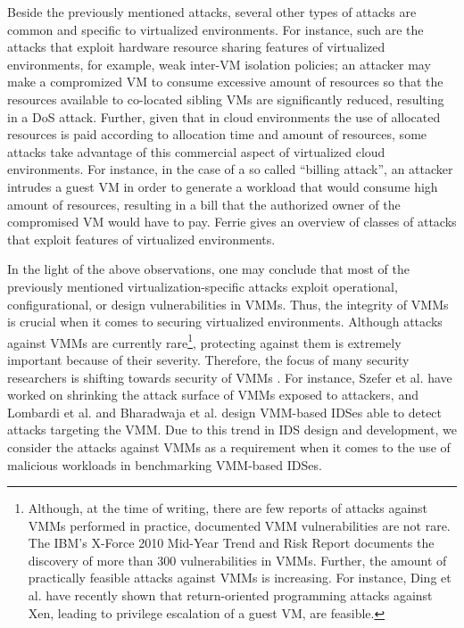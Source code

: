 Beside the previously mentioned attacks, several other types of attacks are common and specific to virtualized environments. For instance, such are the attacks that exploit hardware resource sharing features of virtualized environments, for example, weak inter-VM isolation policies; an attacker may make a compromized VM to consume excessive amount of resources so that the resources available to co-located sibling VMs are significantly reduced, resulting in a DoS attack. Further, given that in cloud environments the use of allocated resources is paid according to allocation time and amount of resources, some attacks take advantage of this commercial aspect of virtualized cloud environments. For instance, in the case of a so called ``billing attack'', an attacker intrudes a guest VM in order to generate a workload that would consume high amount of resources, resulting in a bill that the authorized owner of the compromised VM would have to pay. Ferrie \cite{ferrie:attacks} gives an overview of classes of attacks that exploit features of virtualized environments. 

In the light of the above observations, one may conclude that most of the previously mentioned virtualization-specific attacks exploit operational, configurational, or design vulnerabilities in VMMs. Thus, the integrity of VMMs is crucial when it comes to securing virtualized environments. Although attacks against VMMs are currently rare\footnote{Although, at the time of writing, there are few reports of attacks against VMMs performed in practice, documented VMM vulnerabilities are not rare. The IBM's X-Force 2010 Mid-Year Trend and Risk Report \cite{ibm:midterm} documents the discovery of more than 300 vulnerabilities in VMMs. Further, the amount of practically feasible attacks against VMMs is increasing. For instance, Ding et al. \cite{ding:return_oriented} have recently shown that return-oriented programming attacks against Xen, leading to privilege escalation of a guest VM, are feasible.}, protecting against them is extremely important because of their severity. Therefore, the focus of many security researchers is shifting towards security of VMMs \cite{informationweek:vulnerability}. For instance, Szefer et al. \cite{szefer:eliminating} have worked on shrinking the attack surface of VMMs exposed to attackers, and Lombardi et al. \cite{lombardi:secure} and Bharadwaja et al. \cite{bharadwaja:axen} design VMM-based IDSes able to detect attacks targeting the VMM. Due to this trend in IDS design and development, we consider the attacks against VMMs as a requirement when it comes to the use of malicious workloads in benchmarking VMM-based IDSes.

